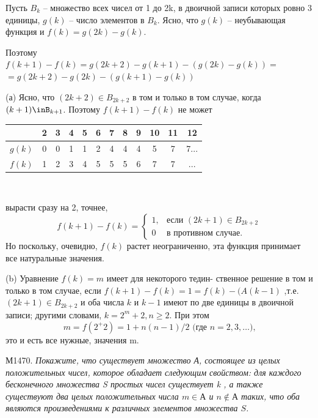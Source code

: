 \begin{multicols}{2}
Пусть $B_k$ -- множество всех чисел от 1 до 2k, в двоичной записи которых ровно 3 единицы, $g(k)$ -- число элементов в $B_k$. Ясно, что $g(k)$ -- неубывающая функция и $f(k) = g(2k) - g(k)$.\par
Поэтому\\
$f(k+1) - f(k) = g(2k+2) - g(k+1) - (g(2k) - g(k)) = $\\
$ = g(2k+2) - g(2k) - (g(k+1)-g(k))$\\
\par
(а) Ясно, что $(2k+2) \in B_{2k+2}$ в том и только в том случае, когда $(k+1)\inB_{k+1}$. Поэтому $f(k+1) - f(k)$ не может
\vfill\null
\columnbreak
\begin{tabular}{|c|c|c|c|c|c|c|c|c|c|c|c|}
    \hline
     & 2 & 3 & 4 & 5 & 6 & 7 & 8 & 9 & 10 & 11 & 12 \\
    \hline
    $g(k)$ & 0 & 0 & 1 & 1 & 2 & 4 & 4 & 4 & 5 & 7 & 7...\\
    \hline
    $f(k)$ & 1 & 2 & 3 & 4 & 5 & 5 & 5 & 6 & 7 & 7 & ...\\
    \hline
\end{tabular}\\\par
вырасти сразу на 2, точнее,
\begin{equation*}
f(k+1) - f(k) = 
 \begin{cases}
   1, &\text{если $(2k+1) \in B_{2k+2}$}
   \\
   0 &\text{в противном случае.}
 \end{cases}
\end{equation*}
Но поскольку, очевидно, $f(k)$ растет неограниченно, эта функция принимает все натуральные значения.\par
(b) Уравнение $f(k)=m$ имеет для некоторого тедин- ственное решение в том и только в том случае, если $f(k+1) - f(k)=1=f(k) - (A(k-1)$ ,т.е. $(2k+1) \in B_{2k+2}$ и оба числа $k$ и $k - 1$ имеют по две единицы в двоичной записи; другими словами, $k = 2^m + 2, n \ge 2$. При этом
$$m=f(2^ +2) = 1+n(n-1)/2 \text{ (где $n=2, 3, … $),}$$
это и есть все нужные, значения m.\\\par
М1470. \textit{Покажите, что существует множество А, состоящее из целых положительных чисел, которое обладает следующим свойством: для каждого бесконечного множества S простых чисел существует k , а также существуют два целых положительных числа $m \in \text{А}$ и $n \notin \text{А}$ таких, что оба являются произведениями к различных элементов множества $S$.}\\\par

\end{multicols}
